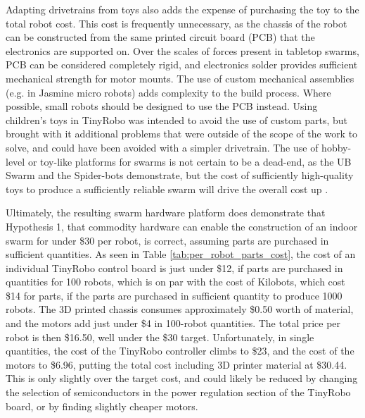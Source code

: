 Adapting drivetrains from toys also adds the expense of purchasing the toy to the total robot cost.  
This cost is frequently unnecessary, as the chassis of the robot can be constructed from the same printed circuit board (PCB) that the electronics are supported on. 
Over the scales of forces present in tabletop swarms, PCB can be considered completely rigid, and electronics solder provides sufficient mechanical strength for motor mounts. 
The use of custom mechanical assemblies (e.g. in Jasmine micro robots) adds complexity to the build process. 
Where possible, small robots should be designed to use the PCB instead. 
Using children's toys in TinyRobo was intended to avoid the use of custom parts, but brought with it additional problems that were outside of the scope of the work to solve, and could have been avoided with a simpler drivetrain. 
The use of hobby-level or toy-like platforms for swarms is not certain to be a dead-end, as the UB Swarm and the Spider-bots demonstrate, but the cost of sufficiently high-quality toys to produce a sufficiently reliable swarm will drive the overall cost up \citep{patil2016ub, price2014spider}. 
 
Ultimately, the resulting swarm hardware platform does demonstrate that Hypothesis 1, that commodity hardware can enable the construction of an indoor swarm for under \$30 per robot, is correct, assuming parts are purchased in sufficient quantities.
As seen in Table \ref{tab:per_robot_parts_cost}, the cost of an individual TinyRobo control board is just under \$12, if parts are purchased in quantities for 100 robots, which is on par with the cost of Kilobots, which cost \$14 for parts, if the parts are purchased in sufficient quantity to produce 1000 robots. 
The 3D printed chassis consumes approximately \$0.50 worth of material, and the motors add just under \$4 in 100-robot quantities. 
The total price per robot is then \$16.50, well under the \$30 target.
Unfortunately, in single quantities, the cost of the TinyRobo controller climbs to \$23, and the cost of the motors to \$6.96, putting the total cost including 3D printer material at \$30.44.
This is only slightly over the target cost, and could likely be reduced by changing the selection of semiconductors in the power regulation section of the TinyRobo board, or by finding slightly cheaper motors.
 
 
